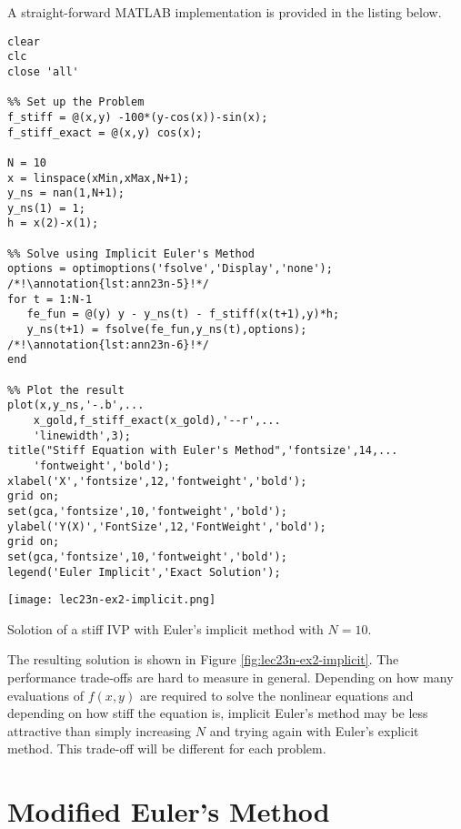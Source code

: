 A straight-forward MATLAB implementation is provided in the listing below.
\begin{lstlisting}[style=myMatlab,name=lec23n-ex2]
clear
clc
close 'all'

%% Set up the Problem
f_stiff = @(x,y) -100*(y-cos(x))-sin(x);
f_stiff_exact = @(x,y) cos(x);

N = 10
x = linspace(xMin,xMax,N+1);
y_ns = nan(1,N+1);
y_ns(1) = 1;
h = x(2)-x(1);

%% Solve using Implicit Euler's Method
options = optimoptions('fsolve','Display','none'); /*!\annotation{lst:ann23n-5}!*/
for t = 1:N-1
   fe_fun = @(y) y - y_ns(t) - f_stiff(x(t+1),y)*h;
   y_ns(t+1) = fsolve(fe_fun,y_ns(t),options); /*!\annotation{lst:ann23n-6}!*/
end

%% Plot the result
plot(x,y_ns,'-.b',...
    x_gold,f_stiff_exact(x_gold),'--r',...
    'linewidth',3);
title("Stiff Equation with Euler's Method",'fontsize',14,...
    'fontweight','bold');
xlabel('X','fontsize',12,'fontweight','bold');
grid on;
set(gca,'fontsize',10,'fontweight','bold');
ylabel('Y(X)','FontSize',12,'FontWeight','bold');
grid on;
set(gca,'fontsize',10,'fontweight','bold');
legend('Euler Implicit','Exact Solution');
\end{lstlisting}
\begin{marginfigure}
\texttt{[image: lec23n-ex2-implicit.png]}
\caption{Solotion of a stiff IVP with Euler's implicit method with $N=10$.}
\label{fig:lec23n-ex2-implicit}
\end{marginfigure}
The resulting solution is shown in Figure \ref{fig:lec23n-ex2-implicit}.  The performance trade-offs are hard to measure in general. Depending on how many evaluations of $f(x,y)$ are required to solve the nonlinear equations and depending on how stiff the equation is, implicit Euler's method may be less attractive than simply increasing $N$ and trying again with Euler's explicit method.  This trade-off will be different for each problem.

\section{Modified Euler's Method}

